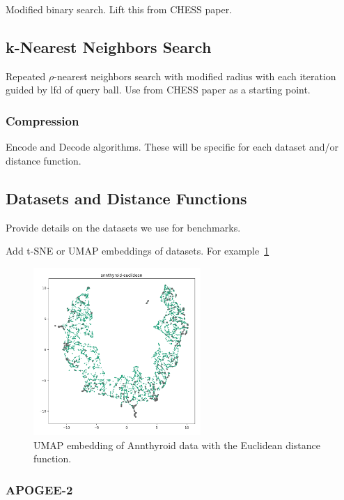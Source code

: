 Modified binary search.
Lift this from CHESS paper.

\subsection{k-Nearest Neighbors Search}
\label{subsubsec:methods:algorithms:knn-search}

Repeated $\rho$-nearest neighbors search with modified radius with each iteration guided by lfd of query ball.
Use from CHESS paper as a starting point.

\subsubsection{Compression}
\label{subsubsec:methods:algorithms:compression}

Encode and Decode algorithms.
These will be specific for each dataset and/or distance function.


\subsection{Datasets and Distance Functions}
\label{subsec:methods:datasets-and-distance-functions}

Provide details on the datasets we use for benchmarks.

Add t-SNE or UMAP embeddings of datasets. For example~\ref{fig:discussion:umap-annthyroid-euclidean}

\begin{figure}[ht!]
    \centering
    \includegraphics[width=2.5in]{images/umaps/annthyroid-euclidean-umap2d.png}
    \caption{UMAP embedding of Annthyroid data with the Euclidean distance function.}
    \label{fig:discussion:umap-annthyroid-euclidean}
\end{figure}

\subsubsection{APOGEE-2}
\label{subsec:methods:datasets:apogee-2}

